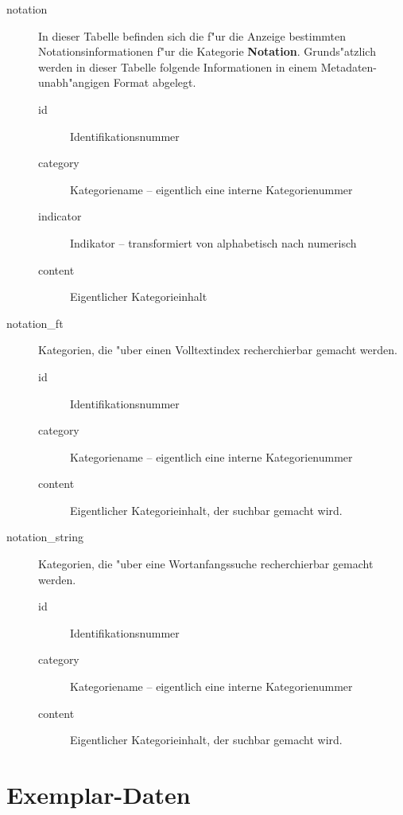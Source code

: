 \documentclass[11pt, twoside, a4paper, BCOR8mm, DIV12, bibtotoc,idxtotoc]{scrbook}
\begin{document}
\begin{itemize}
\begin{description}
\item[notation] In dieser Tabelle befinden sich die f"ur die Anzeige
  bestimmten Notationsinformationen f"ur die Kategorie
  \textbf{Notation}. Grunds"atzlich werden in dieser Tabelle
  folgende Informationen in einem Metadaten-unabh"angigen Format
  abgelegt.
  \begin{description}
  \item[id] Identifikationsnummer
  \item[category] Kategoriename -- eigentlich eine interne Kategorienummer
  \item[indicator] Indikator -- transformiert von alphabetisch nach numerisch
  \item[content] Eigentlicher Kategorieinhalt
  \end{description}
\item[notation\_ft] Kategorien, die "uber einen Volltextindex recherchierbar
  gemacht werden.
  \begin{description}
  \item[id] Identifikationsnummer
  \item[category] Kategoriename -- eigentlich eine interne Kategorienummer
  \item[content] Eigentlicher Kategorieinhalt, der suchbar gemacht wird.
  \end{description}
\item[notation\_string] Kategorien, die "uber eine Wortanfangssuche
  recherchierbar gemacht werden.
  \begin{description}
  \item[id] Identifikationsnummer
  \item[category] Kategoriename -- eigentlich eine interne Kategorienummer
  \item[content] Eigentlicher Kategorieinhalt, der suchbar gemacht wird.
  \end{description}
\end{description}

\section{Exemplar-Daten}


\end{itemize}
\end{document}
